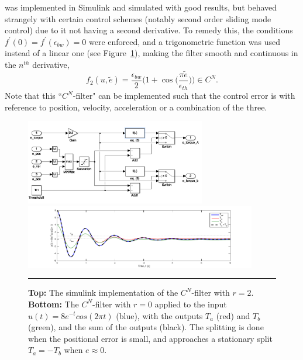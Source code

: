 \documentclass{article}
\begin{document}
was implemented in Simulink and simulated with good results, but behaved strangely with certain control schemes (notably second order sliding mode control) due to it not having a second derivative. To remedy this, the conditions $f^{\prime}(0) = f^{\prime}(\epsilon_{bw}) = 0$ were enforced, and a trigonometric function was used instead of a linear one (see Figure~\ref{fig:filter}), making the filter smooth and continuous in the $n^{th}$ derivative,
\begin{equation}
f_2(u,\tilde{e}) = \frac{\epsilon_{bw}}{2}\Big(1+\cos\Big(\frac{\pi \tilde{e}}{\epsilon_{th}}\Big)\Big) \in C^N.
\end{equation}
Note that this ``$C^N$-filter" can be implemented such that the control error is with reference to position, velocity, acceleration or a combination of the three.

\begin{figure}[htbp]
\centering
\includegraphics[width=0.7\textwidth]{figures/CN_filter.png}
\includegraphics[width=0.9\textwidth]{figures/CNFILT.png}
\rule{35em}{0.5pt}
\caption{\textbf{Top:} The simulink implementation of the  $C^N$-filter with $r=2$. \textbf{Bottom:} The $C^N$-filter with $r=0$ applied to the input $u(t) = 8e^{-t}cos(2\pi t)$ (blue), with the outputs $T_a$ (red) and $T_b$ (green), and the sum of the outputs (black). The splitting is done when the positional error is small, and approaches a stationary split $T_a=-T_b$ when $e\approx 0$.}
\label{fig:filter}
\end{figure}
\end{document}
